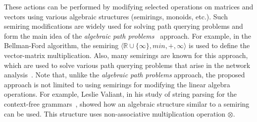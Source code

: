 These actions can be performed by modifying selected operations on matrices and vectors using various algebraic structures (semirings, monoids, etc.). Such semiring modifications are widely used for solving path querying problems and form the main idea of the \textit{algebraic path problems}~\cite{rote1990path} approach. For example, in the Bellman-Ford algorithm, the semiring $\langle \mathbb{R} \cup \{\infty\}, min, +, \infty \rangle$ is used to define the vector-matrix multiplication. Also, many semirings are known for this approach, which are used to solve various path querying problems that arise in the network analysis~\cite{baras2010path}. Note that, unlike the \textit{algebraic path problems} approach, the proposed approach is not limited to using semirings for modifying the linear algebra operations. For example, Leslie Valiant, in his study of string parsing for the context-free grammars~\cite{valiant1975general}, showed how an algebraic structure similar to a semiring can be used. This structure uses non-associative multiplication operation $\otimes$.


